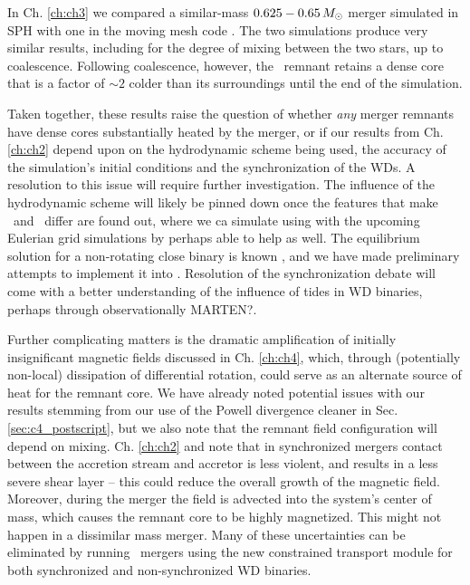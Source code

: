 In Ch. \ref{ch:ch3} we compared a similar-mass $0.625-0.65\,\Msun$ merger simulated in SPH with one in the moving mesh code \arepo.  The two simulations produce very similar results, including for the degree of mixing between the two stars, up to coalescence.  Following coalescence, however, the \arepo\ remnant retains a dense core that is a factor of $\sim2$ colder than its surroundings until the end of the simulation.

Taken together, these results raise the question of whether \textit{any} merger remnants have dense cores substantially heated by the merger, or if our results from Ch. \ref{ch:ch2} depend upon on the hydrodynamic scheme being used, the accuracy of the simulation's initial conditions and the synchronization of the WDs.  A resolution to this issue will require further investigation.  The influence of the hydrodynamic scheme will likely be pinned down once the features that make \gasoline\ and \arepo\ differ are found out, where we ca simulate using  with the upcoming Eulerian grid simulations by \cite{katz+16} perhaps able to help as well.  The equilibrium solution for a non-rotating close binary is known \citep{uryue98}, and we have made preliminary attempts to implement it into \gasoline.  Resolution of the synchronization debate will come with a better understanding of the influence of tides in WD binaries, perhaps through observationally {\charles MARTEN?}.

Further complicating matters is the dramatic amplification of initially insignificant magnetic fields discussed in Ch. \ref{ch:ch4}, which, through (potentially non-local) dissipation of differential rotation, could serve as an alternate source of heat for the remnant core.  We have already noted potential issues with our results stemming from our use of the Powell divergence cleaner in Sec. \ref{sec:c4_postscript}, but we also note that the remnant field configuration will depend on mixing.  Ch. \ref{ch:ch2} and \citep{dan+14} note that in synchronized mergers contact between the accretion stream and accretor is less violent, and results in a less severe shear layer -- this could reduce the overall growth of the magnetic field.  Moreover, during the merger the field is advected into the system's center of mass, which causes the remnant core to be highly magnetized.  This might not happen in a dissimilar mass merger.  Many of these uncertainties can be eliminated by running \arepo\ mergers using the new constrained transport module for both synchronized and non-synchronized WD binaries.


